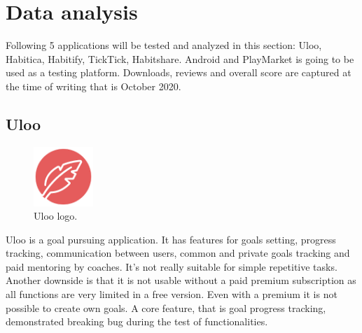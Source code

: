 \section{Data analysis}\label{sec:data-analysis}

Following 5 applications will be tested and analyzed in this section: Uloo, Habitica, Habitify, TickTick, Habitshare.
Android and PlayMarket is going to be used as a testing platform.
Downloads, reviews and overall score are captured at the time of writing that is October 2020.

\subsection{Uloo}\label{subsec:uloo}

\begin{figure}[h!]
    \includegraphics[width=0.20\textwidth]{images/uloo-logo.png}
    \caption{Uloo logo.\cite{uloo-logo}}
    \label{fig:uloo-logo}
\end{figure}

Uloo is a goal pursuing application.
It has features for goals setting, progress tracking, communication between users, common and private goals tracking and paid mentoring by coaches.
It's not really suitable for simple repetitive tasks.
Another downside is that it is not usable without a paid premium subscription as all functions are very limited in a free version.
Even with a premium it is not possible to create own goals.
A core feature, that is goal progress tracking, demonstrated breaking bug during the test of functionalities.

